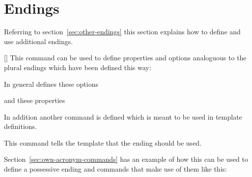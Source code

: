 \documentclass{acro-manual}
\begin{document}
\section{Endings}\label{sec:endings}
Referring to section~\vref{sec:other-endings} this section explains how to
define and use additional endings.
\begin{commands}
  []
    This command can be used to define properties and options analoguous to
    the plural endings which have been defined this way:
\end{commands}
\begin{sourcecode}
\end{sourcecode}
In general  defines these
options
\begin{options}
\end{options}
and these properties
\begin{properties}
  \Initial*
  \Initial*
  \Initial*
  \Initial*
  \Initial*
  \Initial*
\end{properties}
In addition another command is defined which is meant to be used in
template definitions.
\begin{commands}
    This command tells the template that the ending  should be
    used.
\end{commands}
Section~\vref{sec:own-acronym-commands} has an example of how this can be used
to define a possessive ending and commands that make use of them like this:
\begin{example}
\end{example}
\end{document}
